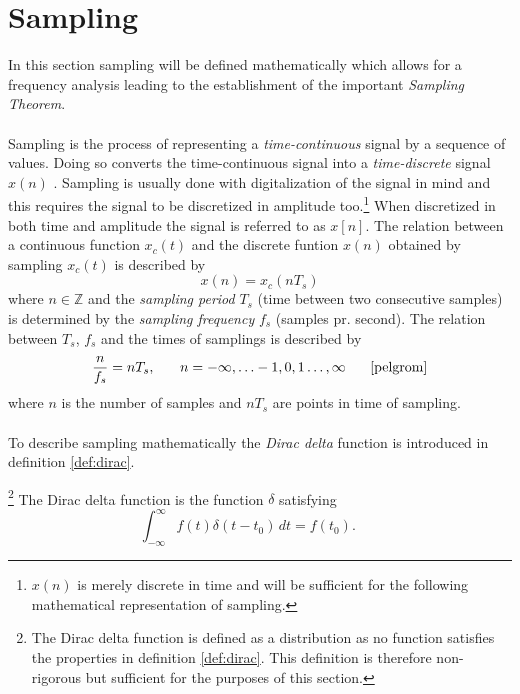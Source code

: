 \section{Sampling}\label{sec:sampling}
In this section sampling will be defined mathematically which allows for a frequency analysis leading to the establishment of the important \textit{Sampling Theorem}.\\\\
Sampling is the process of representing a \textit{time-continuous} signal by a sequence of values. Doing so converts the time-continuous signal into a \textit{time-discrete} signal $x(n)$ \cite{pelgrom}. Sampling is usually done with digitalization of the signal in mind and this requires the signal to be discretized in amplitude too.\footnote{$x(n)$ is merely discrete in time and will be sufficient for the following mathematical representation of sampling.} When discretized in both time and amplitude the signal is referred to as $x[n]$. The relation between a continuous function $x_c(t)$ and the discrete funtion $x(n)$ obtained by sampling $x_c(t)$ is described by
\begin{equation}\label{eq:sampling_principle}
x(n)=x_c(nT_s)
\end{equation}
where $n\in\mathbb{Z}$ and the \textit{sampling period }$T_s$ (time between two consecutive samples) is determined by the \textit{sampling frequency} $f_s$ (samples pr. second). The relation between $T_s$, $f_s$ and the times of samplings is described by
\begin{equation}\label{eq:sample_freq}
\frac{n}{f_s}=nT_s, \phantom{mm} n=-\infty,\hdots-1,0,1\hdots,\infty \phantom{mm}\text{\cite{pelgrom}}
\end{equation}
where $n$ is the number of samples and $nT_s$ are points in time of sampling.\\\\
To describe sampling mathematically the \textit{Dirac delta} function is introduced in definition \ref{def:dirac}.
\begin{definition}\footnote{The Dirac delta function is defined as a distribution as no function satisfies the properties in definition \ref{def:dirac}. This definition is therefore non-rigorous but sufficient for the purposes of this section.}\label{def:dirac}
The Dirac delta function is the function $\delta$ satisfying
\begin{equation}
\int_{-\infty}^{\infty} \! f(t)\delta(t-t_0) \, dt=f(t_0).\phantom{mm}
\end{equation}
\end{definition}
